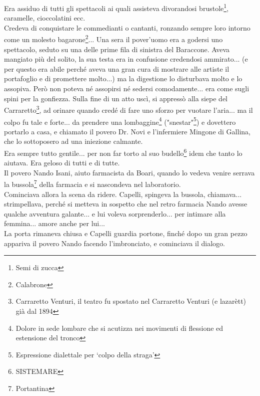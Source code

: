Era assiduo di tutti gli spettacoli ai quali assisteva divorandosi brustole\footnote{Semi di zucca}, caramelle, cioccolatini ecc.\\
Credeva di conquistare le commedianti o cantanti, ronzando sempre loro intorno come un molesto bagarone\footnote{Calabrone}... Una sera il pover'uomo era a godersi uno spettacolo, seduto su una delle prime fila di sinistra del Baraccone. Aveva mangiato più del solito, la sua testa era in confusione credendosi ammirato... (e per questo era abile perché aveva una gran cura di mostrare alle artiste il portafoglio e di promettere molto...) ma la digestione lo disturbava molto e lo assopiva. Però non poteva né assopirsi né sedersi comodamente... era come sugli spini per la gonfiezza. Sulla fine di un atto uscì, si appressò alla siepe del Carraretto\footnote{Carraretto Venturi, il teatro fu spostato nel Carraretto Venturi (e lazarètt) già dal 1894}, ad orinare quando credé di fare uno sforzo per vuotare l'aria... ma il colpo fu tale e forte... da prendere una lombaggine\footnote{Dolore in sede lombare che si acutizza nei movimenti di flessione ed estensione del tronco} ("snestar"\footnote{Espressione dialettale per ‘colpo della straga'}) e dovettero portarlo a casa, e chiamato il povero Dr. Novi e l'infermiere Mingone di Gallina, che lo sottoposero ad una iniezione calmante. \\
Era sempre tutto gentile... per non far torto al suo budello\footnote{SISTEMARE} idem che tanto lo aiutava. Era geloso di tutti e di tutte.\\
Il povero Nando Isani, aiuto farmacista da Boari, quando lo vedeva venire serrava la bussola\footnote{Portantina} della farmacia e si nascondeva nel laboratorio.\\
Cominciava allora la scena da ridere. Capelli, spingeva la bussola, chiamava... strimpellava, perché si metteva in sospetto che nel retro farmacia Nando  avesse qualche avventura galante... e lui voleva sorprenderlo... per intimare alla femmina... amore anche per lui... \\
La porta rimaneva chiusa e Capelli guardia portone, finché dopo un gran pezzo appariva il povero Nando  facendo l'imbronciato, e cominciava il dialogo.\\
